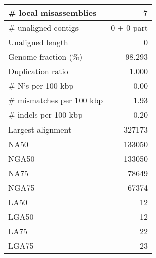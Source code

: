 \documentclass[12pt,a4paper]{article}
\begin{document}
\begin{table}[ht]
\begin{center}
\begin{tabular}{|l*{1}{|r}|}
\# local misassemblies & 7 \\ \hline
\# unaligned contigs & 0 + 0 part \\ \hline
Unaligned length & 0 \\ \hline
Genome fraction (\%) & 98.293 \\ \hline
Duplication ratio & 1.000 \\ \hline
\# N's per 100 kbp & 0.00 \\ \hline
\# mismatches per 100 kbp & 1.93 \\ \hline
\# indels per 100 kbp & 0.20 \\ \hline
Largest alignment & 327173 \\ \hline
NA50 & 133050 \\ \hline
NGA50 & 133050 \\ \hline
NA75 & 78649 \\ \hline
NGA75 & 67374 \\ \hline
LA50 & 12 \\ \hline
LGA50 & 12 \\ \hline
LA75 & 22 \\ \hline
LGA75 & 23 \\ \hline
\end{tabular}
\end{center}
\end{table}
\end{document}
